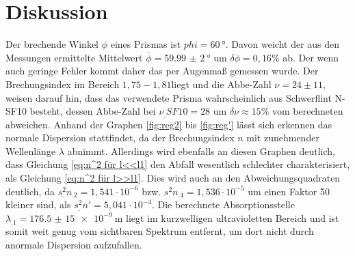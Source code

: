 
\section{Diskussion}
\label{sec:Diskussion}
Der brechende Winkel $\phi$ eines Prismas ist $phi=\SI{60}{\degree}$. Davon weicht der aus den Messungen ermittelte Mittelwert $\bar{\phi}=\SI{59,99(2)}{\degree}$ um $\delta\phi=0,16\%$ ab. Der wenn auch geringe Fehler kommt daher das per Augenmaß gemessen wurde. Der Brechungsindex im Bereich $1,75-1,81$liegt und die Abbe-Zahl $\nu=24\pm 11$, weisen darauf hin, dass das verwendete Prisma wahrscheinlich aus Schwerflint N-SF10 besteht, dessen Abbe-Zahl bei $\nu_.{SF10}=28$ um $\delta\nu\approx 15\%$ vom berechneten abweichen.
Anhand der Graphen \ref{fig:reg2} bis \ref{fig:reg'} lässt sich erkennen das normale Dispersion stattfindet, da der Brechungsindex $n$ mit zunehmender Wellenlänge $\lambda$ abnimmt. Allerdings wird ebenfalls an diesen Graphen deutlich, dass Gleichung \eqref{eq:n^2 für l<<l1} den Abfall wesentlich schlechter charakterisiert, als Gleichung \eqref{eq:n^2 für l>>l1}. Dies wird auch an den Abweichungsquadraten deutlich, da
$s^2_.{n_.2}=1,541\cdot 10^{-6}$ bzw. $s^2_.{n_.4}=1,536\cdot 10^{-5}$ um einen Faktor 50 kleiner sind, als $s^2_.{n'}=5,041\cdot 10^{-4}$.
Die berechnete Absorptionsstelle $\lambda_.1=\SI{176,5(15)e-9}{\metre}$ liegt im kurzwelligen ultravioletten Bereich und ist somit weit genug vom sichtbaren Spektrum entfernt, um dort nicht durch anormale Dispersion aufzufallen.
